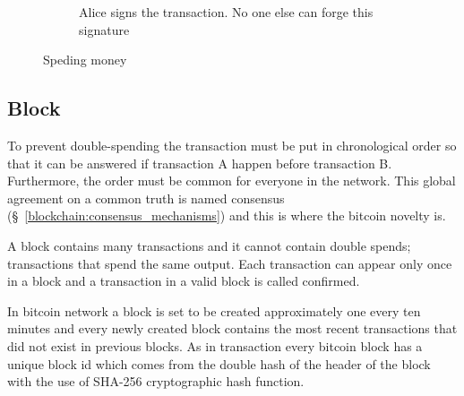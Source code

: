 \begin{figure}[ht!]
\begin{subfigure}[t]{0.50\textwidth}
    \caption{Alice signs the transaction. No one else can forge this signature}
    \label{fig:bl_spent:d}
  \end{subfigure}
  \caption{Speding money}
  \label{fig:bl_spent}
\end{figure}

\subsection{Block}\label{blockchain:structure:block}

To prevent double-spending the transaction must be put in chronological order so that it can be answered
if transaction A happen before transaction B. Furthermore, the order must be common for everyone in the network.
This global agreement on a common truth is named consensus (§~\ref{blockchain:consensus_mechanisms}) and this is where the bitcoin novelty is.

A block contains many transactions and it cannot contain double spends; transactions that spend the same output.
Each transaction can appear only once in a block and a transaction in a valid block is called confirmed.

In bitcoin network a block is set to be created approximately one every ten minutes and every newly created block contains the most recent transactions that did not
exist in previous blocks. As in transaction every bitcoin block has a unique block id which comes from the double hash of the header of the block with the use of SHA-256 cryptographic hash function.

